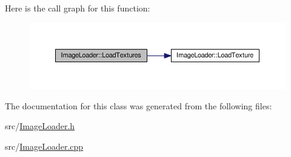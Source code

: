Here is the call graph for this function\+:\nopagebreak
\begin{figure}[H]
\begin{center}
\leavevmode
\includegraphics[width=350pt]{class_image_loader_adc8753fda50916c2e53d3e071502bb74_cgraph}
\end{center}
\end{figure}




The documentation for this class was generated from the following files\+:\begin{DoxyCompactItemize}
\item 
src/\hyperlink{_image_loader_8h}{Image\+Loader.\+h}\item 
src/\hyperlink{_image_loader_8cpp}{Image\+Loader.\+cpp}\end{DoxyCompactItemize}
